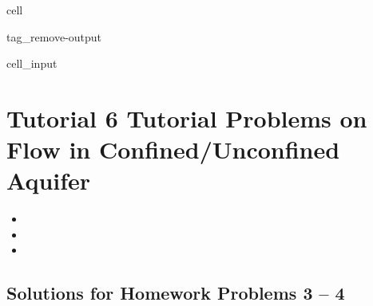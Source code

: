 \documentclass[letterpaper,10pt,english]{jupyterBook}
\begin{document}
\begin{sphinxuseclass}{cell}
\begin{sphinxuseclass}{tag_remove-output}\begin{sphinxVerbatimInput}

\begin{sphinxuseclass}{cell_input}
\begin{sphinxVerbatim}[commandchars=\\\{\}]
   
   
    
   
    
  
\end{sphinxVerbatim}

\end{sphinxuseclass}\end{sphinxVerbatimInput}

\end{sphinxuseclass}
\end{sphinxuseclass}

\chapter{Tutorial 6 \sphinxhyphen{} Tutorial Problems on Flow in Confined/Unconfined Aquifer}
\label{\detokenize{content/tutorials/T6/tutorial_06:tutorial-6-tutorial-problems-on-flow-in-confined-unconfined-aquifer}}\label{\detokenize{content/tutorials/T6/tutorial_06::doc}}\begin{itemize}
\item {} 
\sphinxAtStartPar
{}

\item {} 
\sphinxAtStartPar
{}

\item {} 
\sphinxAtStartPar
{}

\end{itemize}


\section{Solutions for Homework Problems 3 – 4}
\label{\detokenize{content/tutorials/T6/tutorial_06:solutions-for-homework-problems-3-4}}
\end{document}
